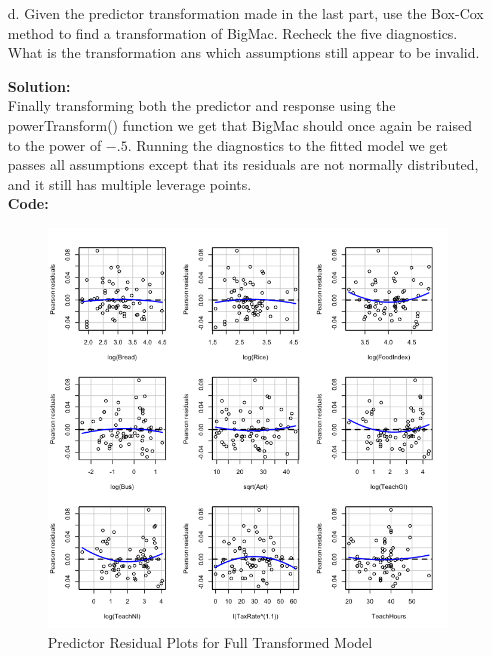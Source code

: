 \documentclass[12pt]{article}
\makeatletter
\theoremstyle{homework}
\newenvironment{exercise}[1]
{\def\@currentlabel{#1}\exercisecore}
{\endexercisecore}
\newcommand{\localhead}[1]{\par\smallskip\noindent\textbf{#1}\nobreak\\}%
\newcommand\solution{\localhead{Solution:}}
\makeatother
\begin{document}
\begin{exercise}{1}
\begin{enumerate}
      \item[d.] Given the predictor transformation made in the last part, use the Box-Cox method to find a transformation of 
      BigMac. Recheck the five diagnostics. What is the transformation ans which assumptions still appear to be invalid. \\
      \solution Finally transforming both the predictor and response using the powerTransform() function we get that BigMac should 
      once again be raised to the power of $-.5$. Running the diagnostics to the fitted model we get passes all assumptions except that 
      its residuals are not normally distributed, and it still has multiple leverage points. \\
      \textbf{Code:}
      \begin{center}
      
      \end{center} 
      \begin{figure}[H]
        \begin{center}
        \caption{Predictor Residual Plots for Full Transformed Model}
        \includegraphics[width = \textwidth]{Rplot09.png}
        \end{center}
      \end{figure}
      \begin{figure}[H]
        \begin{center}

\end{center}
\end{figure}
\end{enumerate}
\end{exercise}
\end{document}
